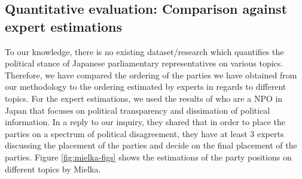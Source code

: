 \documentclass[final,5p,times,twocolumn,authoryear]{elsarticle}
\begin{document}
\subsection{Quantitative evaluation: Comparison against expert estimations}
To our knowledge, there is no existing dataset/research which quantifies the political stance of Japanese parliamentary representatives on various topics. Therefore, we have compared the ordering of the parties we have obtained from our methodology to the ordering estimated by experts in regards to different topics. For the expert estimations, we used the results of \citeauthor{Mielka} who are a NPO in Japan that focuses on political transparency and dissimation of political information. In a reply to our inquiry, they shared that in order to place the parties on a spectrum of political disagreement, they have at least 3 experts discussing the placement of the parties and decide on the final placement of the parties. Figure \ref{fig:mielka-figs} shows the estimations of the party positions on different topics by Mielka.
\end{document}
